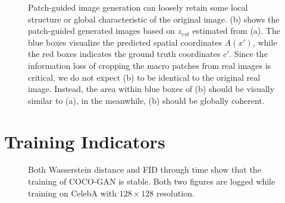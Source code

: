 \documentclass{article}
\newcommand{\modelName}{COCO-GAN }
\begin{document}
\begin{appendices}
\begin{figure}[H]
        \hfill {}
        
        \caption{Patch-guided image generation can loosely retain some local structure or global characteristic of the original image. (b) shows the patch-guided generated images based on $z_{\textit{est}}$ estimated from (a). The {\color{blue} blue} boxes visualize the predicted spatial coordinates $A(x')$, while the {\color{red} red} boxes indicates the ground truth coordinates $c'$. Since the information loss of cropping the macro patches from real images is critical, we do not expect (b) to be identical to the original real image. Instead, the area within blue boxes of (b) should be visually similar to (a), in the meanwhile, (b) should be globally coherent.}
    \end{figure}
    
\section{Training Indicators}
    \label{appendix:indicator-curves}
    \begin{figure}[H]
        \centering
        
        \caption{Both Wasserstein distance and FID through time show that the  training of \modelName is stable. Both two figures are logged while training on CelebA with $128\times 128$ resolution.}
        \label{fig:indicator-curves}
    \end{figure}
    
    \vspace{1em}

\end{appendices}

 
\end{document}
